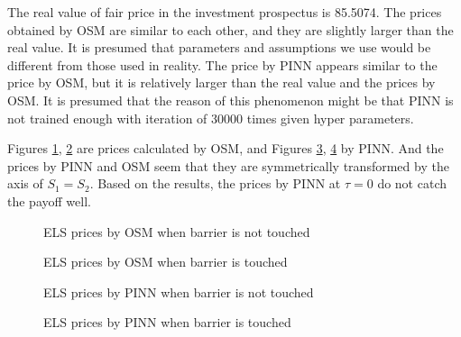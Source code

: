 \documentclass[11pt,reqno]{article}
\numberwithin{equation}{section}
\begin{document}
{The real value of fair price in the investment prospectus is 85.5074.
The prices obtained by OSM are similar to each other, and they are slightly larger than the real value.
It is presumed that parameters and assumptions we use would be different from those used in reality. 
The price by PINN appears similar to the price by OSM, but it is relatively larger than the real value and the prices by OSM. It is presumed that the reason of this phenomenon might be that PINN is not trained enough with iteration of 30000 times given hyper parameters. 

Figures \ref{ELS OSM u}, \ref{ELS OSM ku} are prices calculated by OSM, and Figures \ref{ELS PINN u}, \ref{ELS PINN ku} by PINN.
And the prices by PINN and OSM seem that they are symmetrically transformed by the axis of $S_1=S_2$. 
Based on the results, the prices by PINN at $\tau = 0$ do not catch the payoff well.
\begin{figure}[H]
\centering
    \caption{ELS prices by OSM when barrier is not touched}  
    \label{ELS OSM u}
\end{figure}

\begin{figure}[H]
\centering
    \caption{ELS prices by OSM when barrier is touched}  
    \label{ELS OSM ku}
\end{figure}

\begin{figure}[H]
\centering
    \caption{ELS prices by PINN when barrier is not touched}  
    \label{ELS PINN u}
\end{figure}

\begin{figure}[H]
\centering
    \caption{ELS prices by PINN when barrier is touched}  
    \label{ELS PINN ku}
\end{figure}

}
\end{document}

